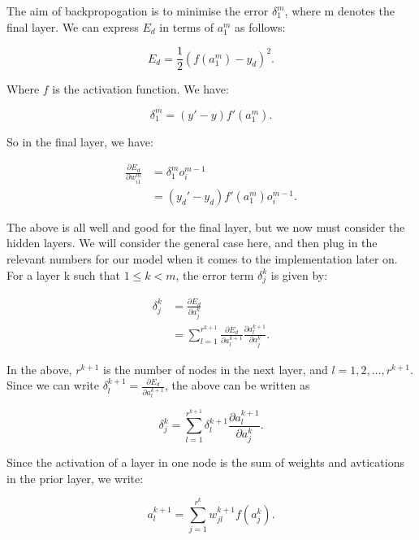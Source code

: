 The aim of backpropogation is to minimise the error $\delta^m_1$, where m denotes the final layer. We can express $E_d$ in terms of $a_1^m$ as follows:

\begin{equation}
    E_d = \frac{1}{2} (f(a_1^m)-y_d)^2.
\end{equation}

Where $f$ is the activation function. We have:

\begin{equation}
    \delta_1^m = (y'-y)f'(a_1^m).
\end{equation}

So in the final layer, we have:

\begin{align}
    \frac{\partial E_d}{\partial w_{i1}^m} &= \delta_1^mo_i^{m-1} \\
                                           &= (y_d'-y_d)f'(a_1^m)o_i^{m-1}.
\end{align}

The above is all well and good for the final layer, but we now must consider the hidden layers. We will consider the general case here, and then plug in the relevant
numbers for our model when it comes to the implementation later on. For a layer k such that $1 \leq k < m$, the error term $\delta^k_j$ is given by:

\begin{align}
    \delta_j^k &= \frac{\partial E_d}{\partial a_j^k} \\
               &= \sum_{l=1}^{r^{k+1}} \frac{\partial E_d}{\partial a_l^{k+1}}\frac{\partial a_l^{k+1}}{\partial a_j^k}.
\end{align}

In the above, $r^{k+1}$ is the number of nodes in the next layer, and $ l = 1,2,\ldots,r^{k+1}$. Since we can write $\delta_l^{k+1} = \frac{\partial E_d}{\partial a_l^{k+1}}$, the above can be written
as 

\begin{equation}
    \label{deltajk}
    \delta_j^k = \sum_{l=1}^{r^{k+1}}\delta_l^{k+1}\frac{\partial a_l^{k+1}}{\partial a_j^k}.
\end{equation}

Since the activation of a layer in one node is the sum of weights and avtications in the prior layer, we write:

\begin{equation}
    a_l^{k+1} = \sum^{r^k}_{j=1} w_{jl}^{k+1}f(a_j^k).
\end{equation}

